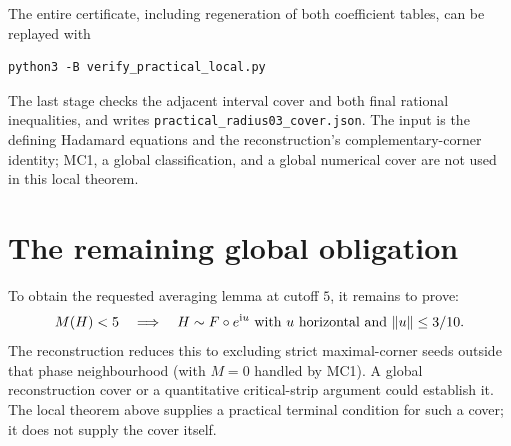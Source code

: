 \documentclass[11pt]{article}
\newcommand{\ii}{\mathrm i}\newcommand{\perm}{\operatorname{perm}}
\begin{document}
The entire certificate, including regeneration of both coefficient tables,
can be replayed with
\begin{verbatim}
python3 -B verify_practical_local.py
\end{verbatim}
The last stage checks the adjacent interval cover and both final rational
inequalities, and writes \texttt{practical\_radius03\_cover.json}.
The input is the defining Hadamard equations and the reconstruction's
complementary-corner identity; MC1, a global classification, and a global
numerical cover are not used in this local theorem.

\section*{The remaining global obligation}
To obtain the requested averaging lemma at cutoff $5$, it remains to prove:
\[
 M(H)<5\quad\Longrightarrow\quad
 H\sim F\circ e^{\ii u}\ \text{with $u$ horizontal and }\norm u\le3/10.
\]
The reconstruction reduces this to excluding strict maximal-corner seeds
outside that phase neighbourhood (with $M=0$ handled by MC1).
A global reconstruction cover or a quantitative critical-strip argument
could establish it. The local theorem above supplies a practical terminal
condition for such a cover; it does not supply the cover itself.
\end{document}
